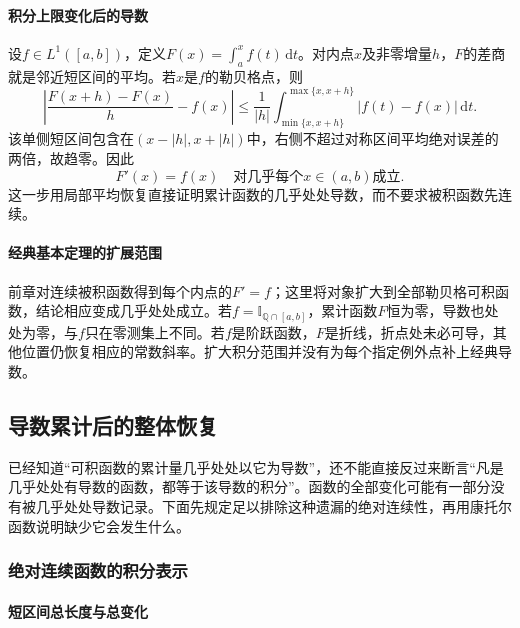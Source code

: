 \paragraph{积分上限变化后的导数}

设$f\in L^1([a,b])$，定义$F(x)=\int_a^xf(t)\,\mathrm dt$。对内点$x$及非零增量$h$，$F$的差商就是邻近短区间的平均。若$x$是$f$的勒贝格点，则
\[
 \left|\frac{F(x+h)-F(x)}h-f(x)\right|
 \leq\frac1{|h|}\int_{\min\{x,x+h\}}^{\max\{x,x+h\}}|f(t)-f(x)|\,\mathrm dt.
\]
该单侧短区间包含在$(x-|h|,x+|h|)$中，右侧不超过对称区间平均绝对误差的两倍，故趋零。因此
\begin{equation}
 F'(x)=f(x)\quad\text{对几乎每个$x\in(a,b)$成立}.
\label{eq:measurable-indefinite-integral-derivative}
\end{equation}
这一步用局部平均恢复直接证明累计函数的几乎处处导数，而不要求被积函数先连续。

\paragraph{经典基本定理的扩展范围}

前章对连续被积函数得到每个内点的$F'=f$；这里将对象扩大到全部勒贝格可积函数，结论相应变成几乎处处成立。若$f=\mathbb I_{\mathbb Q\cap[a,b]}$，累计函数$F$恒为零，导数也处处为零，与$f$只在零测集上不同。若$f$是阶跃函数，$F$是折线，折点处未必可导，其他位置仍恢复相应的常数斜率。扩大积分范围并没有为每个指定例外点补上经典导数。

\subsection{导数累计后的整体恢复}

已经知道“可积函数的累计量几乎处处以它为导数”，还不能直接反过来断言“凡是几乎处处有导数的函数，都等于该导数的积分”。函数的全部变化可能有一部分没有被几乎处处导数记录。下面先规定足以排除这种遗漏的绝对连续性，再用康托尔函数说明缺少它会发生什么。

\subsubsection{绝对连续函数的积分表示}
\paragraph{短区间总长度与总变化}

